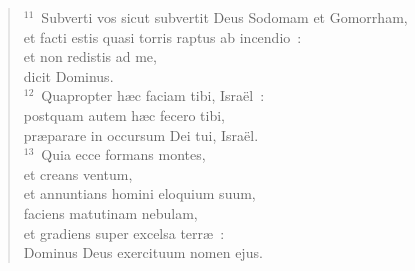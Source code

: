 \begin{flushleft}
\begin{verse}
${}^{11}$~Subverti vos sicut subvertit Deus Sodomam et Gomorrham,\\ et facti estis quasi torris raptus ab incendio~:\\ et non redistis ad me,\\ dicit Dominus.\\
${}^{12}$~Quapropter h\ae c faciam tibi, Isra\"el~:\\ postquam autem h\ae c fecero tibi,\\ pr\ae parare in occursum Dei tui, Isra\"el.\\
${}^{13}$~Quia ecce formans montes,\\ et creans ventum,\\ et annuntians homini eloquium suum,\\ faciens matutinam nebulam,\\ et gradiens super excelsa terr\ae~:\\ Dominus Deus exercituum nomen ejus.\end{verse}\end{flushleft}



